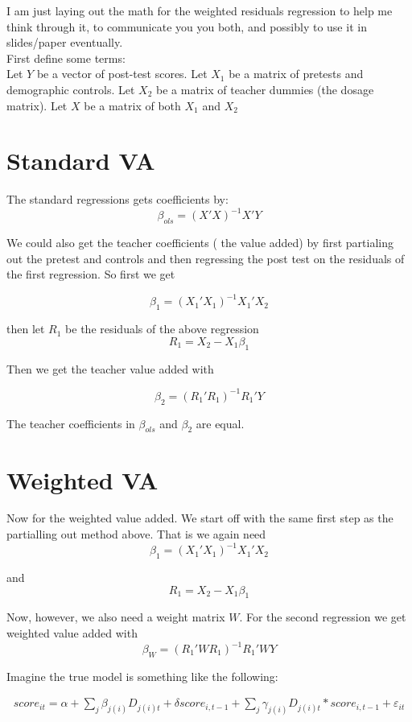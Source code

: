 \documentclass[letterpaper,12pt]{article}
\begin{document}
I am just laying out the math for the weighted residuals regression to help me think through it, to communicate you you both, and possibly to use it in slides/paper eventually. 
\\

First define some terms: 
\\

Let $Y$ be a vector of post-test scores. Let $X_1$ be a matrix of pretests and demographic controls. Let $X_2$ be a matrix of teacher dummies (the dosage matrix). Let $X$ be a matrix of both $X_1$ and $X_2$
\\

\section{Standard VA}
The standard regressions gets coefficients by: 
$$\beta_{ols} = (X'X)^{-1}X'Y $$

We could also get the teacher coefficients ( the value added) by first partialing out the pretest and controls and then regressing the post test on the residuals of the first regression. So first we get 

$$\beta_1 = (X_1'X_1)^{-1}X_1'X_2 $$

then let $R_1$ be the residuals of the above regression 
$$ R_1 = X_2 - X_1 \beta_1$$

Then we get the teacher value added with 

$$ \beta_2 = (R_1'R_1)^{-1}R_1'Y $$

The teacher coefficients in $\beta_{ols}$ and $\beta_2$ are equal.

\section{Weighted VA}

Now for the weighted value added. We start off with the same first step as the partialling out method above. That is we again need 
$$\beta_1 = (X_1'X_1)^{-1}X_1'X_2 $$

and
$$ R_1 = X_2 - X_1 \beta_1$$

Now, however, we also need a weight matrix $W$. For the second regression we get weighted value added with 
$$\beta_{W} = (R_1' W R_1)^{-1}R_1' W Y $$



Imagine the true model is something like the following:

    \begin{align*}
        score_{it} = \alpha + \sum_j \beta_{j(i)}D_{j(i)t} + \delta score_{i,t-1} + \sum_j \gamma_{j(i)} D_{j(i)t} * score_{i, t-1} + \varepsilon_{it}
    \end{align*}
    
\end{document}
